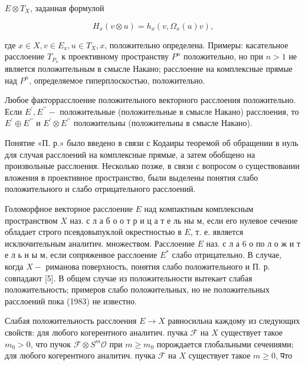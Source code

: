 \documentclass[10pt]{article}
\begin{document}
$E \otimes T_{X}$, заданная формулой



\[

H_{x}(v \otimes u)=h_{x}\left(v, \Omega_{x}(u) v\right),

\]



где $x \in X, v \in E_{x}, u \in T_{X}, x$, положительно определена. Примеры: касательное расслоение $T_{P_{n}}$ к проективному пространству $P^{n}$ положительно, но при $n>1$ не является положительным в смысле Накано; расслоение на комплексные прямые над $P^{n}$, определяемое гиперплоскостью, положительно.



Любое факторрасслоение положительного векторного расслоения положительно. Если $E^{\prime}, E^{\prime \prime}-$ положительные (положительные в смысле Накано) расслоения, то $E^{\prime} \oplus E^{\prime \prime}$ и $E^{\prime} \otimes E^{\prime \prime}$ положительны (положительны в смысле Накано).



Понятие «П. р.» было введено в связи с Кодаиры теоремой об обращении в нуль для случая расслоений на комплексные прямые, а затем обобщено на произвольные расслоения. Несколько позже, в связи с вопросом о существовании вложения в проективное пространство, были выделены понятия слабо положительного и слабо отрицательного расслоений.



Голоморфное векторное расслоение $E$ над компактным комплексным пространством $X$ наз. с л а б о о т р и ц а т е ль ны м, если его нулевое сечение обладает строго псевдовыпуклой окрестностью в $E$, т. е. является исключительным аналитич. множеством. Расслоение $E$ наз. с л а 6 о по л о ж и т е л ь н ы м, если сопряженвое расслоение $E^{*}$ слабо отрицательно. В случае, когда $X-$ риманова поверхность, понятия слабо положительного и П. р. совпадают [5]. В общем случае из положительности вытекает слабая положительность; примеров слабо положительных, но не положительных расслоений пока (1983) не известно.



Слабая положительность расслоения $E \rightarrow X$ равносильна каждому из следующих свойств: для любого когерентного аналитич. пучка $\mathscr{F}$ на $X$ существует такое $m_{0}>0$, что пучок $\mathscr{F} \otimes S^{m} \mathscr{O}$ при $m \geqslant m_{0}$ порождается глобальными сечениями; для любого когерентного аналитич. пучка $\mathscr{F}$ на $X$ существует такое $m \geqslant 0$, पто
\end{document}
